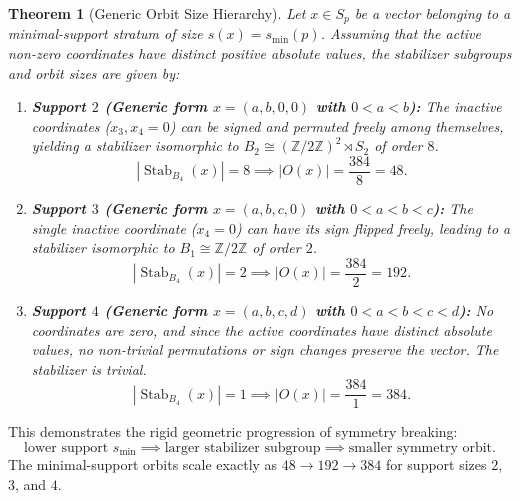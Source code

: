 \documentclass[11pt,a4paper]{article}
\newtheorem{theorem}{Theorem}[section]
\theoremstyle{definition}
\begin{document}
	\begin{theorem}[Generic Orbit Size Hierarchy]
		\label{thm:generic_orbits}
		Let $x \in S_p$ be a vector belonging to a minimal-support stratum of size $s(x) = s_{\min}(p)$. Assuming that the active non-zero coordinates have distinct positive absolute values, the stabilizer subgroups and orbit sizes are given by:
		\begin{enumerate}
			\item \textbf{Support $2$ (Generic form $x = (a, b, 0, 0)$ with $0 < a < b$):}
			The inactive coordinates ($x_3, x_4 = 0$) can be signed and permuted freely among themselves, yielding a stabilizer isomorphic to $B_2 \cong (\mathbb{Z}/2\mathbb{Z})^2 \rtimes S_2$ of order $8$.
			\begin{equation}
				|\operatorname{Stab}_{B_4}(x)| = 8 \implies |O(x)| = \frac{384}{8} = 48.
			\end{equation}
			
			\item \textbf{Support $3$ (Generic form $x = (a, b, c, 0)$ with $0 < a < b < c$):}
			The single inactive coordinate ($x_4 = 0$) can have its sign flipped freely, leading to a stabilizer isomorphic to $B_1 \cong \mathbb{Z}/2\mathbb{Z}$ of order $2$.
			\begin{equation}
				|\operatorname{Stab}_{B_4}(x)| = 2 \implies |O(x)| = \frac{384}{2} = 192.
			\end{equation}
			
			\item \textbf{Support $4$ (Generic form $x = (a, b, c, d)$ with $0 < a < b < c < d$):}
			No coordinates are zero, and since the active coordinates have distinct absolute values, no non-trivial permutations or sign changes preserve the vector. The stabilizer is trivial.
			\begin{equation}
				|\operatorname{Stab}_{B_4}(x)| = 1 \implies |O(x)| = \frac{384}{1} = 384.
			\end{equation}
		\end{enumerate}
	\end{theorem}
	
	This demonstrates the rigid geometric progression of symmetry breaking:
	\begin{equation}
		\boxed{ \text{lower support } s_{\min} \implies \text{larger stabilizer subgroup} \implies \text{smaller symmetry orbit} }.
	\end{equation}
	The minimal-support orbits scale exactly as $48 \longrightarrow 192 \longrightarrow 384$ for support sizes $2$, $3$, and $4$.
	
\end{document}
